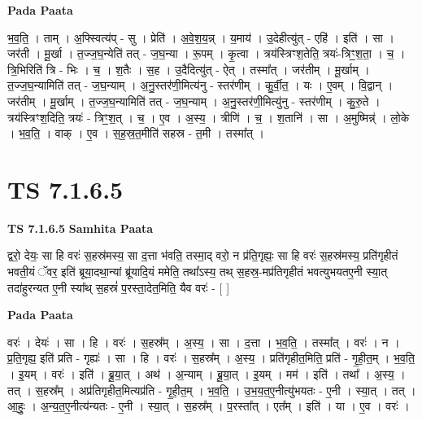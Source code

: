 \documentclass[17pt]{extarticle}
\begin{document}
\textbf{Pada Paata} \newline

भ॒व॒ति॒ । ताम् । अ॒फ्स्वित्य॑प् - सु । प्रेति॑ । अ॒वे॒श॒य॒न्न् । य॒माय॑ । उ॒देहीत्यु॑त् - एहि॑ । इति॑ । सा । जर॑ती । मू॒र्खा । त॒ज्ज॒घ॒न्येति॑ तत् - ज॒घ॒न्या । रू॒पम् । कृ॒त्वा । त्रय॑स्त्रिꣳश॒तेति॒ त्रयः॑-त्रिꣳ॒॒श॒ता॒ । च॒ । त्रि॒भिरिति॑ त्रि - भिः । च॒ । श॒तैः । स॒ह । उ॒दैदित्यु॑त् - ऐत् । तस्मा᳚त् । जर॑तीम् । मू॒र्खाम् । त॒ज्ज॒घ॒न्यामिति॑ तत् - ज॒घ॒न्याम् । अ॒नु॒स्तर॑णी॒मित्य॑नु - स्तर॑णीम् । कु॒र्वी॒त॒ । यः । ए॒वम् । वि॒द्वान् । जर॑तीम् । मू॒र्खाम् । त॒ज्ज॒घ॒न्यामिति॑ तत् - ज॒घ॒न्याम् । अ॒नु॒स्तर॑णी॒मित्यु॑नु - स्तर॑णीम् । कु॒रु॒ते । त्रय॑स्त्रिꣳश॒दिति॒ त्रयः॑ - त्रिꣳ॒॒श॒त् । च॒ । ए॒व । अ॒स्य॒ । त्रीणि॑ । च॒ । श॒तानि॑ । सा । अ॒मुष्मिन्न्॑ । लो॒के । भ॒व॒ति॒ । वाक् । ए॒व । स॒ह॒स्र॒त॒मीति॑ सहस्र - त॒मी । तस्मा᳚त् ।  \newline





\section{ TS 7.1.6.5 }

\textbf{TS 7.1.6.5 } \newline
\textbf{Samhita Paata} \newline

द्वरो॒ देयः॒ सा हि वरः॑ स॒हस्र॑मस्य॒ सा द॒त्ता भ॑वति॒ तस्मा॒द् वरो॒ न प्र॑ति॒गृह्यः॒ सा हि वरः॑ स॒हस्र॑मस्य॒ प्रति॑गृहीतं भवती॒यं ॅवर॒ इति॑ ब्रूया॒दथा॒न्यां ब्रू॑यादि॒यं ममेति॒ तथा᳚ऽस्य॒ तथ् स॒हस्र॒-मप्र॑तिगृहीतं भवत्युभयतए॒नी स्या॒त् तदा॑हुरन्यत ए॒नी स्या᳚थ् स॒हस्रं॑ प॒रस्ता॒देत॒मिति॒ यैव वरः॑ - [  ] \newline

\textbf{Pada Paata} \newline

वरः॑ । देयः॑ । सा । हि । वरः॑ । स॒हस्र᳚म् । अ॒स्य॒ । सा । द॒त्ता । भ॒व॒ति॒ । तस्मा᳚त् । वरः॑ । न । प्र॒ति॒गृह्य॒ इति॑ प्रति - गृह्यः॑ । सा । हि । वरः॑ । स॒हस्र᳚म् । अ॒स्य॒ । प्रति॑गृहीत॒मिति॒ प्रति॑ - गृ॒ही॒त॒म् । भ॒व॒ति॒ । इ॒यम् । वरः॑ । इति॑ । ब्रू॒या॒त् । अथ॑ । अ॒न्याम् । ब्रू॒या॒त् । इ॒यम् । मम॑ । इति॑ । तथा᳚ । अ॒स्य॒ । तत् । स॒हस्र᳚म् । अप्र॑तिगृहीत॒मित्यप्र॑ति - गृ॒ही॒त॒म् । भ॒व॒ति॒ । उ॒भ॒य॒त॒ए॒नीत्यु॑भयतः - ए॒नी । स्या॒त् । तत् । आ॒हुः॒ । अ॒न्य॒त॒ए॒नीत्य॑न्यतः - ए॒नी । स्या॒त् । स॒हस्र᳚म् । प॒रस्ता᳚त् । एत᳚म् । इति॑ । या । ए॒व । वरः॑ ।  \newline
\end{document}
